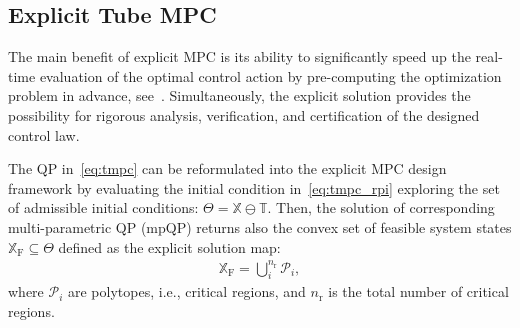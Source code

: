 \documentclass[letterpaper, 10 pt, conference]{ieeeconf}
\begin{document}
\subsection{Explicit Tube MPC}
\label{sec:explicit_mpc}

The main benefit of explicit MPC is its ability to significantly speed up the real-time evaluation of the optimal control action by pre-computing the optimization problem in advance, see~\cite{BM02}. Simultaneously, the explicit solution provides the possibility for rigorous analysis, verification, and certification of the designed control law. 

The QP in~\eqref{eq:tmpc} can be reformulated into the explicit MPC design framework by evaluating the initial condition in~\eqref{eq:tmpc_rpi} exploring the set of admissible initial conditions: $\Theta = \mathbb{X} \ominus \mathbb{T}$. Then, the solution of corresponding multi-parametric QP (mpQP) returns also the convex set of feasible system states $\mathbb{X}_{\mathrm{F}} \subseteq \Theta$ defined as the explicit solution map:
\begin{eqnarray}
	\label{eq:tmpc_partition}
	\mathbb{X}_{\mathrm{F}} = \bigcup_{i}^{n_{\mathrm{r}}} \mathcal{P}_{i} ,
\end{eqnarray}
where $\mathcal{P}_{i}$ are polytopes, i.e., critical regions, and $n_{\mathrm{r}}$ is the total number of critical regions.
\end{document}
